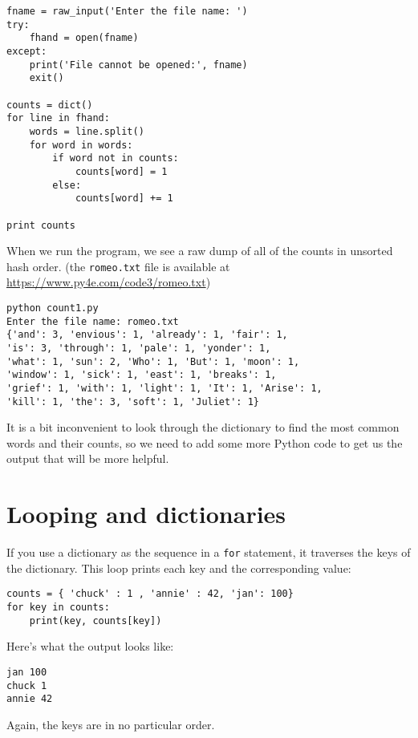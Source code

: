 \beforeverb
\begin{verbatim}
fname = raw_input('Enter the file name: ')
try:
    fhand = open(fname)
except:
    print('File cannot be opened:', fname)
    exit()

counts = dict()
for line in fhand:
    words = line.split()
    for word in words:
        if word not in counts:
            counts[word] = 1
        else:
            counts[word] += 1

print counts
\end{verbatim}
\afterverb
%
When we run the program, we see a raw dump of all of the counts in unsorted
hash order.
(the {\tt romeo.txt} file is available at
\url{https://www.py4e.com/code3/romeo.txt})

\beforeverb
\begin{verbatim}
python count1.py 
Enter the file name: romeo.txt
{'and': 3, 'envious': 1, 'already': 1, 'fair': 1, 
'is': 3, 'through': 1, 'pale': 1, 'yonder': 1, 
'what': 1, 'sun': 2, 'Who': 1, 'But': 1, 'moon': 1, 
'window': 1, 'sick': 1, 'east': 1, 'breaks': 1, 
'grief': 1, 'with': 1, 'light': 1, 'It': 1, 'Arise': 1, 
'kill': 1, 'the': 3, 'soft': 1, 'Juliet': 1}
\end{verbatim}
\afterverb
%
It is a bit inconvenient to look through the dictionary to find the
most common words and their counts, so we need to add some more 
Python code to get us the output that will be more helpful.

\section{Looping and dictionaries}


If you use a dictionary as the sequence 
in a {\tt for} statement, it traverses
the keys of the dictionary.  This loop
prints each key and the corresponding value:

\beforeverb
\begin{verbatim}
counts = { 'chuck' : 1 , 'annie' : 42, 'jan': 100}
for key in counts:
    print(key, counts[key])
\end{verbatim}
\afterverb
%
Here's what the output looks like:

\beforeverb
\begin{verbatim}
jan 100
chuck 1
annie 42
\end{verbatim}
\afterverb
%
Again, the keys are in no particular order.

